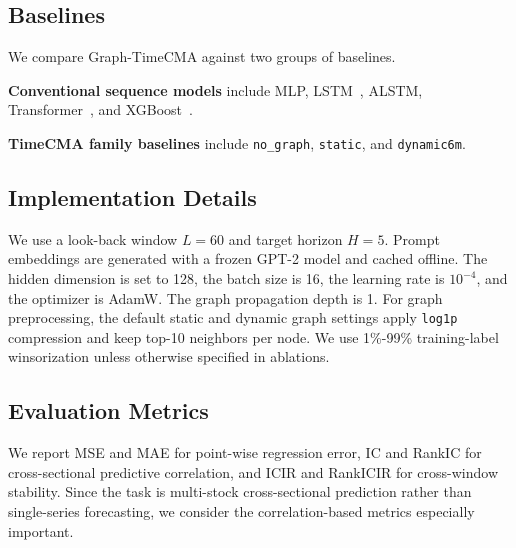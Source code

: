\documentclass[runningheads]{llncs}
\begin{document}
\subsection{Baselines}

We compare Graph-TimeCMA against two groups of baselines.

\textbf{Conventional sequence models} include MLP, LSTM~\cite{hochreiter1997long}, ALSTM, Transformer~\cite{vaswani2017attention}, and XGBoost~\cite{chen2016xgboost}.

\textbf{TimeCMA family baselines} include \texttt{no\_graph}, \texttt{static}, and \texttt{dynamic6m}.

\subsection{Implementation Details}

We use a look-back window $L = 60$ and target horizon $H = 5$. Prompt embeddings are generated with a frozen GPT-2 model and cached offline. The hidden dimension is set to 128, the batch size is 16, the learning rate is $10^{-4}$, and the optimizer is AdamW. The graph propagation depth is 1. For graph preprocessing, the default static and dynamic graph settings apply \texttt{log1p} compression and keep top-10 neighbors per node. We use 1\%-99\% training-label winsorization unless otherwise specified in ablations.

\subsection{Evaluation Metrics}

We report MSE and MAE for point-wise regression error, IC and RankIC for cross-sectional predictive correlation, and ICIR and RankICIR for cross-window stability. Since the task is multi-stock cross-sectional prediction rather than single-series forecasting, we consider the correlation-based metrics especially important.
\end{document}

